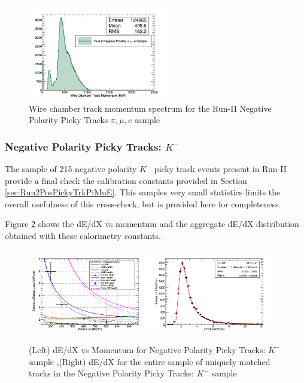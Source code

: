 \begin{figure}[htb]
\centering
\includegraphics[width=0.55\textwidth]{images/WCTrkMomentumRun2NegPiMuE.png}
\caption{Wire chamber track momentum spectrum for the Run-II Negative Polarity Picky Tracks $\pi, \mu, e$ sample  }
\label{fig:Run2NegPickyTrkPiMuEMomentumSpec}
\end{figure}


\subsubsection{Negative Polarity Picky Tracks: $K^{-}$}\label{sec:Run2NegPickyTrkKaonMinus}
The sample of 215 negative polarity $K^{-}$ picky track events present in Run-II provide a final check the calibration constants provided in Section \ref{sec:Run2PosPickyTrkPiMuE}. This samples very small statistics limits the overall usefulness of this cross-check, but is provided here for completeness.

Figure \ref{fig:Run2NegPickyTrkKaonResults} shows the dE/dX vs momentum and the aggregate dE/dX distribution obtained with these calorimetry constants.

\begin{figure}[htb]
\centering
\includegraphics[width=0.48\textwidth]{images/dEdXvsMomentumNegPolRun2Kaon.png}
\includegraphics[width=0.48\textwidth]{images/dEdXKaonRunIINegPol.png}
\caption{(Left) dE/dX vs Momentum for Negative Polarity Picky Tracks: $K^{-}$ sample ,(Right) dE/dX for the entire sample of uniquely matched tracks in the Negative Polarity Picky Tracks: $K^{-}$ sample }
\label{fig:Run2NegPickyTrkKaonResults}
\end{figure}


